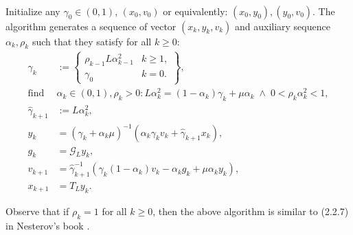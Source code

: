 \documentclass[12pt]{article}
\begin{document}
    \begin{definition}\label{def:wapg}
        \;\\
        Initialize any $\gamma_0 \in (0, 1)$, $(x_0, v_0)$ or equivalently: $(x_0, y_0), (y_0, v_0)$. 
        The algorithm generates a sequence of vector $(x_k, y_k, v_k)$ and auxiliary sequence $\alpha_k, \rho_k$ such that they satisfy for all $k\ge 0$: 
        $$
        \begin{aligned}
            \gamma_k &:= \left.\begin{cases}
                \rho_{k -1}L\alpha_{k - 1}^2 & k \ge 1,
                \\
                \gamma_0 & k = 0. 
            \end{cases}\right\rbrace,
            \\
            \text{find }&\alpha_k \in (0, 1), \rho_k > 0: L\alpha_k^2 = (1 - \alpha_k)\gamma_k + \mu \alpha_k  \;\wedge \; 0 < \rho_k \alpha_k^2 < 1, 
            \\
            \hat \gamma_{k + 1} &:= L\alpha_k^2, 
            \\
            y_k &= 
            (\gamma_k + \alpha_k \mu)^{-1}(\alpha_k \gamma_k v_k + \hat\gamma_{k + 1} x_k), 
            \\
            g_k &= \mathcal G_L y_k, 
            \\
            v_{k + 1} &= 
            \hat\gamma^{-1}_{k + 1}
            (\gamma_k(1 - \alpha_k) v_k - \alpha_k g_k + \mu \alpha_k y_k), 
            \\
            x_{k + 1} &= T_L y_k. 
        \end{aligned}
        $$
    \end{definition}
    \begin{observation}
        Observe that if $\rho_k = 1$ for all $k\ge 0$, then the above algorithm is similar to (2.2.7) in Nesterov's book \cite{nesterov_lectures_2018}. 
    \end{observation}
\end{document}
